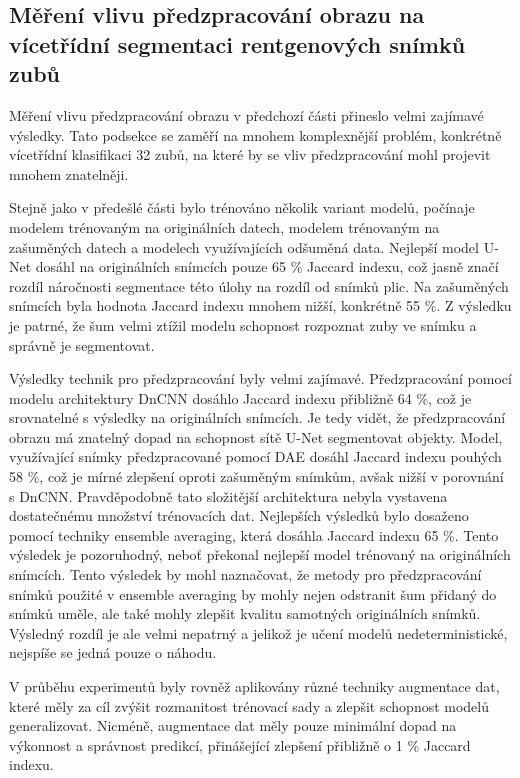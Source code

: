 \documentclass[male,czech,api_ing]{thesis}
\begin{document}
\subsection{Měření vlivu předzpracování obrazu na vícetřídní segmentaci rentgenových snímků zubů}
Měření vlivu předzpracování obrazu v předchozí části přineslo velmi zajímavé výsledky. Tato podsekce se zaměří na mnohem komplexnější problém, konkrétně vícetřídní klasifikaci 32 zubů, na které by se vliv předzpracování mohl projevit mnohem znatelněji.

Stejně jako v předešlé části bylo trénováno několik variant modelů, počínaje modelem trénovaným na originálních datech, modelem trénovaným na zašuměných datech a modelech využívajících odšuměná data. Nejlepší model U-Net dosáhl na originálních snímcích pouze 65 \% Jaccard indexu, což jasně značí rozdíl náročnosti segmentace této úlohy na rozdíl od snímků plic. Na zašuměných snímcích byla hodnota Jaccard indexu mnohem nižší, konkrétně 55 \%. Z výsledku je patrné, že šum velmi ztížil modelu schopnost rozpoznat zuby ve snímku a správně je segmentovat.

Výsledky technik pro předzpracování byly velmi zajímavé. Předzpracování pomocí modelu architektury DnCNN dosáhlo Jaccard indexu přibližně 64 \%, což je srovnatelné s výsledky na originálních snímcích. Je tedy vidět, že předzpracování obrazu má znatelný dopad na schopnost sítě U-Net segmentovat objekty. Model, využívající snímky předzpracované pomocí DAE dosáhl Jaccard indexu pouhých 58 \%, což je mírné zlepšení oproti zašuměným snímkům, avšak nižší v porovnání s DnCNN. Pravděpodobně tato složitější architektura nebyla vystavena dostatečnému množství trénovacích dat. Nejlepších výsledků bylo dosaženo pomocí techniky ensemble averaging, která dosáhla Jaccard indexu 65 \%. Tento výsledek je pozoruhodný, neboť překonal nejlepší model trénovaný na originálních snímcích. Tento výsledek by mohl naznačovat, že metody pro předzpracování snímků použité v ensemble averaging by mohly nejen odstranit šum přidaný do snímků uměle, ale také mohly zlepšit kvalitu samotných originálních snímků. Výsledný rozdíl je ale velmi nepatrný a jelikož je učení modelů nedeterministické, nejspíše se jedná pouze o náhodu.

V průběhu experimentů byly rovněž aplikovány různé techniky augmentace dat, které měly za cíl zvýšit rozmanitost trénovací sady a zlepšit schopnost modelů generalizovat. Nicméně, augmentace dat měly pouze minimální dopad na výkonnost a správnost predikcí, přinášející zlepšení přibližně o 1 \% Jaccard indexu.
\end{document}
